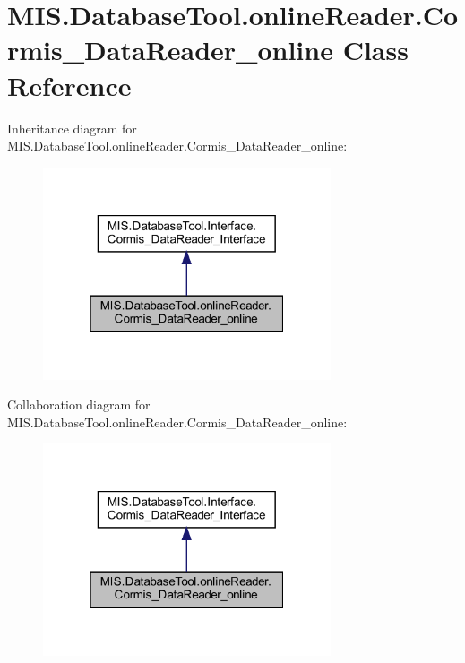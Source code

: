 \hypertarget{classMIS_1_1DatabaseTool_1_1onlineReader_1_1Cormis__DataReader__online}{}\section{M\+I\+S.\+Database\+Tool.\+online\+Reader.\+Cormis\+\_\+\+Data\+Reader\+\_\+online Class Reference}
\label{classMIS_1_1DatabaseTool_1_1onlineReader_1_1Cormis__DataReader__online}


Inheritance diagram for M\+I\+S.\+Database\+Tool.\+online\+Reader.\+Cormis\+\_\+\+Data\+Reader\+\_\+online\+:\nopagebreak
\begin{figure}[H]
\begin{center}
\leavevmode
\includegraphics[width=241pt]{classMIS_1_1DatabaseTool_1_1onlineReader_1_1Cormis__DataReader__online__inherit__graph}
\end{center}
\end{figure}


Collaboration diagram for M\+I\+S.\+Database\+Tool.\+online\+Reader.\+Cormis\+\_\+\+Data\+Reader\+\_\+online\+:\nopagebreak
\begin{figure}[H]
\begin{center}
\leavevmode
\includegraphics[width=241pt]{classMIS_1_1DatabaseTool_1_1onlineReader_1_1Cormis__DataReader__online__coll__graph}
\end{center}
\end{figure}
